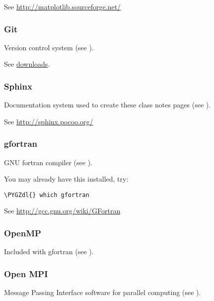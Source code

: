 \documentclass[letterpaper,10pt,english]{sphinxmanual}
\def\PYGZdl{\char`\$}
\begin{document}
See \url{http://matplotlib.sourceforge.net/}


\subsubsection{Git}
\label{software_installation:git}\label{software_installation:installing-git}
Version control system (see {\hyperref[git:git]{}}).

See \href{http://git-scm.com/downloads}{downloads}.


\subsubsection{Sphinx}
\label{software_installation:installing-sphinx}\label{software_installation:sphinx}
Documentation system used to create these class notes pages (see
{\hyperref[sphinx:sphinx]{}}).

See \url{http://sphinx.pocoo.org/}


\subsubsection{gfortran}
\label{software_installation:installing-gfortran}\label{software_installation:gfortran}
GNU fortran compiler (see {\hyperref[fortran:fortran]{}}).

You may already have this installed, try:

\begin{Verbatim}[commandchars=\\\{\}]
\PYGZdl{} which gfortran
\end{Verbatim}

See \url{http://gcc.gnu.org/wiki/GFortran}


\subsubsection{OpenMP}
\label{software_installation:openmp}\label{software_installation:installing-openmp}
Included with gfortran (see {\hyperref[openmp:openmp]{}}).


\subsubsection{Open MPI}
\label{software_installation:installing-mpi}\label{software_installation:open-mpi}
Message Passing Interface software for parallel computing (see {\hyperref[mpi:mpi]{}}).
\end{document}

